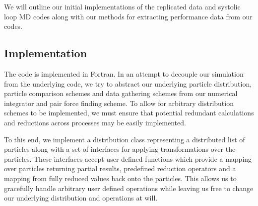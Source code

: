 We will outline our initial implementations of
the replicated data and systolic loop MD codes
along with our methods for extracting performance data from our codes.

\subsection{Implementation}

The code is implemented in Fortran.
%
In an attempt to decouple our simulation from the underlying code,
we try to abstract our underlying
particle distribution,
particle comparison schemes and
data gathering schemes
from our numerical integrator and pair force finding scheme.
%
To allow for arbitrary distribution schemes to be implemented,
we must ensure that potential redundant calculations and reductions
across processes may be easily implemented.

To this end, we implement a distribution class
representing a distributed list of particles
along with a set of interfaces for applying transformations over the particles.
%
These interfaces accept user defined functions which provide
a mapping over particles returning partial results,
predefined reduction operators and
a mapping from fully reduced values back onto the particles.
%
This allows us to gracefully handle arbitrary user defined operations while
leaving us free to change our underlying distribution and operations
at will.

